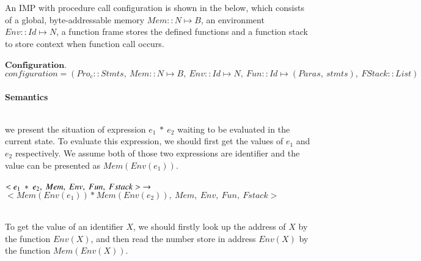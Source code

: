 \documentclass[letterpaper, 10 pt, conference]{IEEEtran}
\begin{document}
\par An IMP with procedure call configuration is shown in the below, which consists of a global, byte-addressable memory $Mem::N\mapsto B$, an environment $Env::Id\mapsto N$, a function frame stores the defined functions and a function stack to store context when function call occurs. \\ \\
$\textbf{Configuration.}$\\
$configuration=(Pro_c::Stmts,~Mem::N\mapsto B,~Env::Id\mapsto N,~Fun::Id\mapsto (Paras,~stmts),~FStack::List)$\\ \\
\textbf{Semantics}\\ \\
\par we present the situation of expression $e_1~*~e_2$ waiting to be evaluated in the current state. To evaluate this expression, we should first get the values of $e_1$ and $e_2$ respectively. We assume both of those two expressions are identifier and the value can be presented as $Mem(Env(e_1))$.  \\ \\
$<e_1~*~e_2,~Mem,~Env,~Fun,~Fstack>~\rightarrow\\ \\$
$<Mem(Env(e_1))*Mem(Env(e_2)),~Mem,~Env,~Fun,~Fstack>$\\ \\
\par To get the value of an identifier $X$, we should firstly look up the address of $X$ by the function $Env(X)$, and then read the number store in address $Env(X)$ by the function $Mem(Env(X))$. \\ \\
\end{document}
